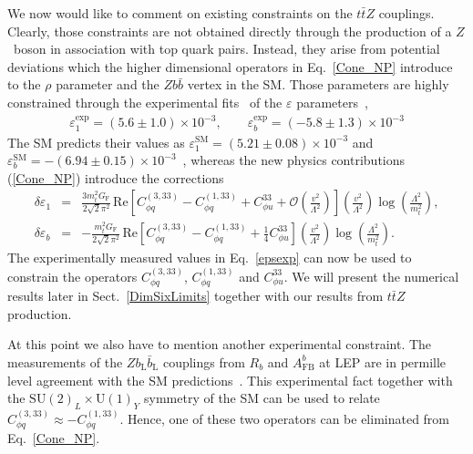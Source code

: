 \documentclass[preprint]{JHEP3}
\def\ttbZ{t\bar{t}Z}
\newcommand{\be}{\begin{eqnarray}}
\newcommand{\ee}{\end{eqnarray}}
\begin{document}
We now would like to comment on existing constraints on the $\ttbZ$ couplings.
Clearly, those constraints are not obtained directly through the production of a $Z$~boson in association with top quark pairs.
Instead, they arise from potential deviations which the higher dimensional operators in Eq.~\ref{Cone_NP} introduce to the $\rho$ parameter and the $Z b \bar{b}$ vertex in the SM.
Those parameters are highly constrained through the experimental fits~\cite{Ciuchini:2013pca} of the $\varepsilon$ parameters~\cite{Altarelli:1993sz},
\be
   \label{epsexp}
   \varepsilon_1^\mathrm{exp} = (5.6 \pm 1.0) \times 10^{-3}, \quad \quad \varepsilon_b^\mathrm{exp} = (-5.8 \pm 1.3) \times 10^{-3}
\ee
The SM predicts their values as $\varepsilon_1^\mathrm{SM} = (5.21 \pm 0.08) \times 10^{-3} $ and $\varepsilon_b^\mathrm{SM} = -(6.94 \pm 0.15) \times 10^{-3}$~\cite{Ciuchini:2013pca},
whereas the new physics contributions (\ref{Cone_NP}) introduce the corrections~\cite{Larios:1999au}
\be
   \delta \varepsilon_1 &=& \frac{3 m_t^2 G_\mathrm{F}}{2\sqrt{2}\pi^2}  
   \, \mathrm{Re}\left[  C^{(3,33)}_{\phi q}-C^{(1,33)}_{\phi q} + C^{33}_{\phi u} + \mathcal{O}\left(\frac{v^2}{\Lambda^2} \right) \right]
   \left( \frac{v^2}{\Lambda^2} \right) \log\left(\frac{\Lambda^2}{m_t^2}\right),
   \\
   \delta \varepsilon_b &=& -\frac{m_t^2 G_\mathrm{F}}{2\sqrt{2}\pi^2} 
   \, \mathrm{Re}\left[  C^{(3,33)}_{\phi q}-C^{(1,33)}_{\phi q} + \frac14 C^{33}_{\phi u}  \right]
   \left( \frac{v^2}{\Lambda^2} \right)\log\left(\frac{\Lambda^2}{m_t^2}\right).
\ee
The experimentally measured values in Eq.~\ref{epsexp} can now be used to constrain the operators 
$C^{(3,33)}_{\phi q}$,  $C^{(1,33)}_{\phi q}$ and $C^{33}_{\phi u}$.
We will present the numerical results later in Sect.~\ref{DimSixLimits} together with our results from $\ttbZ$ production.

At this point we also have to mention another experimental constraint.
The measurements of the $Z b_\mathrm{L} \bar{b}_\mathrm{L}$ couplings from $R_b$ and $A^{b}_\mathrm{FB}$ at LEP are in permille level agreement 
with the SM predictions~\cite{Abdallah:2008ab}.
This experimental fact together with the $\mathrm{SU(2)}_L \times \mathrm{U(1)}_Y$ symmetry of the SM
can be used to relate $  C^{(3,33)}_{\phi q} \approx - C^{(1,33)}_{\phi q}$.
Hence, one of these two operators can be eliminated from Eq.~\ref{Cone_NP}.
\end{document}
